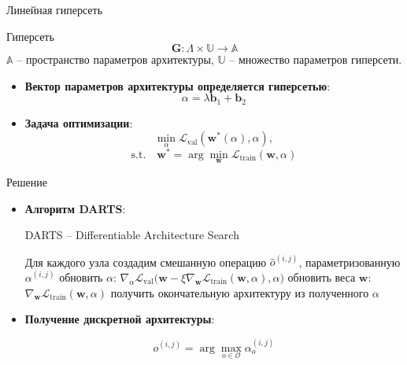 \documentclass{beamer}
\begin{document}
\begin{frame}{Линейная гиперсеть}

\begin{block}{Гиперсеть}
$$\mathbf{G} : \Lambda \times \mathbb{U} \rightarrow \mathbb{A}$$
$\mathbb{A}$ -- пространство параметров архитектуры, $\mathbb{U}$ -- множество параметров гиперсети.
\end{block}

\begin{itemize}
\item \textbf{Вектор параметров архитектуры определяется гиперсетью}:
$$\alpha = \lambda\mathbf{b}_1 + \mathbf{b}_2$$

\item \textbf{Задача оптимизации}:
$$\min_{\alpha}\mathcal{L}_\text{val}(\mathbf{w}^*(\alpha), \alpha),$$ $$
 \mathrm{s.t.}\quad \mathbf{w}^* = \arg\min_{\mathbf{w}}\mathcal{L}_\text{train}(\mathbf{w}, \alpha)$$
\end{itemize}



\end{frame}
\begin{frame}{Решение}
\begin{itemize}
\item \textbf{Алгоритм  DARTS}:
 \begin{algorithm}[H]
\begin{algorithmic}[1]
\caption{DARTS -- Differentiable Architecture Search}
\STATE Для каждого узла создадим смешанную операцию $\hat{o}^{(i, j)}$, параметризованную $\alpha^{(i, j)}$
\STATE  обновить $\alpha$: $\nabla_\alpha \mathcal{L}_\text{val}\bigl(\mathbf{w} - \xi\nabla_{\mathbf{w}}\mathcal{L}_\text{train}(\mathbf{w}, \alpha), \alpha\bigr)$
\STATE обновить веса $\mathbf{w}$: $\nabla_\mathbf{w}\mathcal{L}_\text{train}(\mathbf{w}, \alpha)$
\ENDWHILE
\STATE получить окончательную архитектуру из полученного $\alpha$
\end{algorithmic}
\end{algorithm}
\item \textbf{Получение дискретной архитектуры}:

$$o^{(i, j)} =\arg\max_{o\in\mathcal{O}}\alpha_o^{(i, j)}$$

\end{itemize}

\end{frame}
\end{document}
